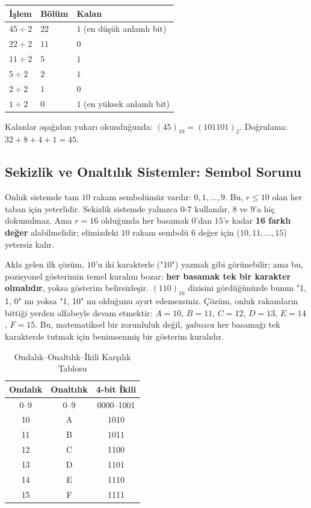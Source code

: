 \begin{ornek}
\begin{center}
\begin{tabular}{lll}
\toprule
İşlem & Bölüm & Kalan \\
\midrule
$45 \div 2$ & $22$ & $1$ (en düşük anlamlı bit) \\
$22 \div 2$ & $11$ & $0$ \\
$11 \div 2$ & $5$ & $1$ \\
$5 \div 2$ & $2$ & $1$ \\
$2 \div 2$ & $1$ & $0$ \\
$1 \div 2$ & $0$ & $1$ (en yüksek anlamlı bit) \\
\bottomrule
\end{tabular}
\end{center}
Kalanlar aşağıdan yukarı okunduğunda: $(45)_{10} = (101101)_2$. Doğrulama:
$32+8+4+1=45$. \checkmark
\end{ornek}

\subsection{Sekizlik ve Onaltılık Sistemler: Sembol Sorunu}
\label{sec:sekizlik-onaltilik}

Onluk sistemde tam $10$ rakam sembolümüz vardır: $0,1,\ldots,9$. Bu, $r\le10$ olan her taban
için yeterlidir. Sekizlik sistemde yalnızca $0$-$7$ kullanılır, $8$ ve $9$'a hiç
dokunulmaz. Ama $r=16$ olduğunda her basamak $0$'dan $15$'e kadar \textbf{16 farklı değer}
alabilmelidir; elimizdeki $10$ rakam sembolü $6$ değer için ($10,11,\ldots,15$) yetersiz kalır.

\begin{bilginot}
Akla gelen ilk çözüm, $10$'u iki karakterle ("10") yazmak gibi görünebilir; ama bu,
pozisyonel gösterimin temel kuralını bozar: \textbf{her basamak tek bir karakter olmalıdır},
yoksa gösterim belirsizleşir. $(110)_{16}$ dizisini gördüğünüzde bunun "1, 1, 0" mı yoksa
"1, 10" mı olduğunu ayırt edemezsiniz. Çözüm, onluk rakamların bittiği yerden alfabeyle
devam etmektir: $A=10$, $B=11$, $C=12$, $D=13$, $E=14$, $F=15$. Bu, matematiksel bir
zorunluluk değil, \emph{yalnızca} her basamağı tek karakterde tutmak için benimsenmiş bir
gösterim kuralıdır.
\end{bilginot}

\begin{table}[h]
\centering
\begin{tabular}{ccc}
\toprule
Ondalık & Onaltılık & 4-bit İkili \\
\midrule
0--9 & 0--9 & 0000--1001 \\
10 & A & 1010 \\
11 & B & 1011 \\
12 & C & 1100 \\
13 & D & 1101 \\
14 & E & 1110 \\
15 & F & 1111 \\
\bottomrule
\end{tabular}
\caption{Ondalık--Onaltılık--İkili Karşılık Tablosu}
\label{tab:hex-tablosu}
\end{table}

